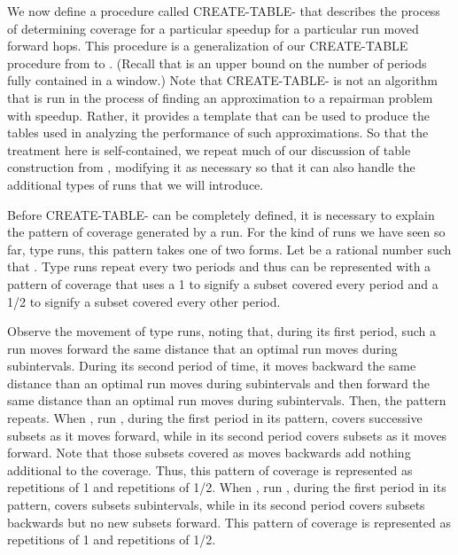 \documentclass[11pt]{article}
\begin{document}
We now define a procedure called CREATE-TABLE- that describes the process of determining coverage for a particular speedup  for a particular run moved forward  hops.  This procedure is a generalization of our CREATE-TABLE procedure from \cite{Frederickson5} to .  (Recall that  is an upper bound on the number of periods fully contained in a window.) Note that CREATE-TABLE- is not an algorithm that is run in the process of finding an approximation to a repairman problem with speedup.  Rather, it provides a template that can be used to produce the tables used in analyzing the performance of such approximations.  So that the treatment here is self-contained, we repeat much of our discussion of table construction from \cite{Frederickson5}, modifying it as necessary so that it can also handle the additional types of runs that we will introduce.

Before CREATE-TABLE- can be completely defined, it is necessary to explain the pattern of coverage generated by a run.  For the kind of runs we have seen so far, type  runs, this pattern takes one of two forms.  Let  be a rational number such that .  Type  runs repeat every two periods and thus can be represented with a pattern of coverage that uses a 1 to signify a subset covered every period and a 1/2 to signify a subset covered every other period.

Observe the movement of type  runs, noting that, during its first period, such a run moves forward the same distance that an optimal run moves during  subintervals.  During its second period of time, it moves backward the same distance than an optimal run moves during  subintervals and then forward the same distance than an optimal run moves during  subintervals. Then, the pattern repeats.  When , run , during the first period in its pattern, covers  successive subsets as it moves forward, while in its second period covers  subsets as it moves forward.  Note that those subsets covered as  moves backwards add nothing additional to the coverage.  Thus, this pattern of coverage is represented as  repetitions of 1 and  repetitions of 1/2.  When , run , during the first period in its pattern, covers  subsets subintervals, while in its second period covers  subsets backwards but no new subsets forward.  This pattern of coverage is represented as  repetitions of 1 and  repetitions of 1/2. 
\end{document}
